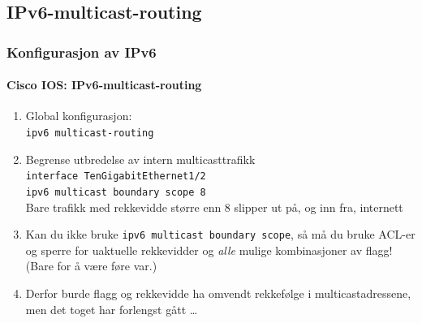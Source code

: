 \subsection{IPv6-multicast-routing}
\begin{frame}%
  \frametitle{Konfigurasjon av IPv6}
  \framesubtitle{Cisco IOS: IPv6-multicast-routing}
  \begin{enumerate}[<+->]
  \item Global konfigurasjon:\\
    \alert{\texttt{ipv6 multicast-routing}}\\
  \item Begrense utbredelse av intern multicasttrafikk\\
    \alert{\texttt{interface TenGigabitEthernet1/2}}\\
    \alert{\texttt{ipv6 multicast boundary scope 8}}\\
    Bare trafikk med rekkevidde større enn 8 slipper ut på, og inn
    fra, internett
  \item Kan du ikke bruke \texttt{ipv6 multicast boundary scope}, så
    må du bruke ACL-er og sperre for uaktuelle rekkevidder og
    \textit{alle\/} mulige kombinasjoner av flagg! (Bare for å være
    føre var.)
  \item Derfor burde flagg og rekkevidde ha omvendt rekkefølge i
    multicastadressene, men det toget har forlengst gått \dots
  \end{enumerate}
\end{frame}

